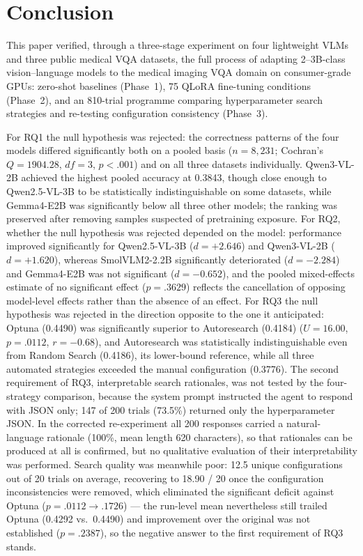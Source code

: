 \section{Conclusion}
\label{sec:conclusion}

This paper verified, through a three-stage experiment on four lightweight VLMs
and three public medical VQA datasets, the full process of adapting 2--3B-class
vision--language models to the medical imaging VQA domain on consumer-grade GPUs:
zero-shot baselines (Phase~1), 75 QLoRA fine-tuning conditions (Phase~2), and an
810-trial programme comparing hyperparameter search strategies and re-testing
configuration consistency (Phase~3).

For RQ1 the null hypothesis was rejected: the correctness patterns of the four
models differed significantly both on a pooled basis ($n = 8{,}231$; Cochran's
$Q = 1904.28$, $df = 3$, $p < .001$) and on all three datasets individually.
Qwen3-VL-2B achieved the highest pooled accuracy at 0.3843, though close enough
to Qwen2.5-VL-3B to be statistically indistinguishable on some datasets, while
Gemma4-E2B was significantly below all three other models; the ranking was
preserved after removing samples suspected of pretraining exposure. For RQ2,
whether the null hypothesis was rejected depended on the model: performance
improved significantly for Qwen2.5-VL-3B ($d = +2.646$) and Qwen3-VL-2B
($d = +1.620$), whereas SmolVLM2-2.2B significantly deteriorated ($d = -2.284$)
and Gemma4-E2B was not significant ($d = -0.652$), and the pooled mixed-effects
estimate of no significant effect ($p = .3629$) reflects the cancellation of
opposing model-level effects rather than the absence of an effect. For RQ3 the
null hypothesis was rejected in the direction opposite to the one it anticipated:
Optuna (0.4490) was significantly superior to Autoresearch (0.4184)
($U = 16.00$, $p = .0112$, $r = -0.68$), and Autoresearch was statistically
indistinguishable even from Random Search (0.4186), its lower-bound reference,
while all three automated strategies exceeded the manual configuration (0.3776).
The second requirement of RQ3, interpretable search rationales, was not tested by
the four-strategy comparison, because the system prompt instructed the agent to
respond with JSON only; 147 of 200 trials (73.5\%) returned only the
hyperparameter JSON. In the corrected re-experiment all 200 responses carried a
natural-language rationale (100\%, mean length 620 characters), so that rationales
can be produced at all is confirmed, but no qualitative evaluation of their
interpretability was performed. Search quality was meanwhile poor: 12.5 unique
configurations out of 20 trials on average, recovering to 18.90 / 20 once the
configuration inconsistencies were removed, which eliminated the significant
deficit against Optuna ($p = .0112 \rightarrow .1726$) --- the run-level mean
nevertheless still trailed Optuna (0.4292 vs.\ 0.4490) and improvement over the
original was not established ($p = .2387$), so the negative answer to the first
requirement of RQ3 stands.

